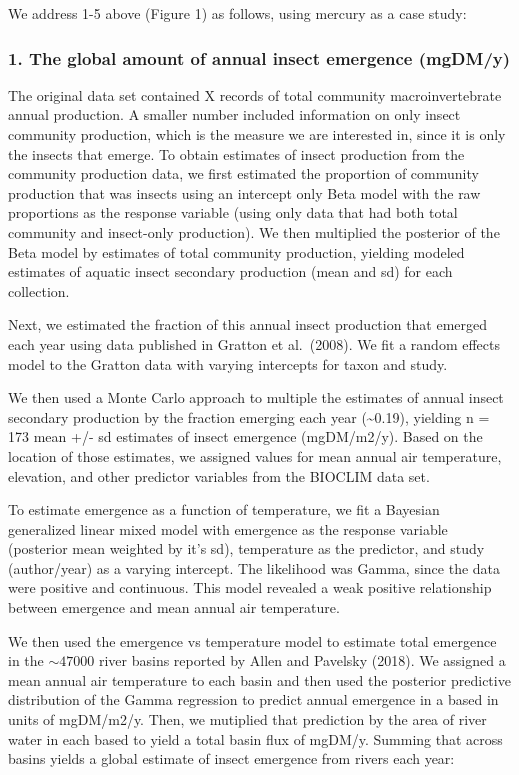 \documentclass[
]{article}
\begin{document}
We address 1-5 above (Figure 1) as follows, using mercury as a case
study:

\hypertarget{the-global-amount-of-annual-insect-emergence-mgdmy}{%
\subsubsection{1. The global amount of annual insect emergence
(mgDM/y)}\label{the-global-amount-of-annual-insect-emergence-mgdmy}}

The original data set contained X records of total community
macroinvertebrate annual production. A smaller number included
information on only insect community production, which is the measure we
are interested in, since it is only the insects that emerge. To obtain
estimates of insect production from the community production data, we
first estimated the proportion of community production that was insects
using an intercept only Beta model with the raw proportions as the
response variable (using only data that had both total community and
insect-only production). We then multiplied the posterior of the Beta
model by estimates of total community production, yielding modeled
estimates of aquatic insect secondary production (mean and sd) for each
collection.

Next, we estimated the fraction of this annual insect production that
emerged each year using data published in Gratton et al.~(2008). We fit
a random effects model to the Gratton data with varying intercepts for
taxon and study.

We then used a Monte Carlo approach to multiple the estimates of annual
insect secondary production by the fraction emerging each year
(\textasciitilde0.19), yielding n = 173 mean +/- sd estimates of insect
emergence (mgDM/m2/y). Based on the location of those estimates, we
assigned values for mean annual air temperature, elevation, and other
predictor variables from the BIOCLIM data set.

To estimate emergence as a function of temperature, we fit a Bayesian
generalized linear mixed model with emergence as the response variable
(posterior mean weighted by it's sd), temperature as the predictor, and
study (author/year) as a varying intercept. The likelihood was Gamma,
since the data were positive and continuous. This model revealed a weak
positive relationship between emergence and mean annual air temperature.

We then used the emergence vs temperature model to estimate total
emergence in the \(\sim 47000\) river basins reported by Allen and
Pavelsky (2018). We assigned a mean annual air temperature to each basin
and then used the posterior predictive distribution of the Gamma
regression to predict annual emergence in a based in units of mgDM/m2/y.
Then, we mutiplied that prediction by the area of river water in each
based to yield a total basin flux of mgDM/y. Summing that across basins
yields a global estimate of insect emergence from rivers each year:
\end{document}
